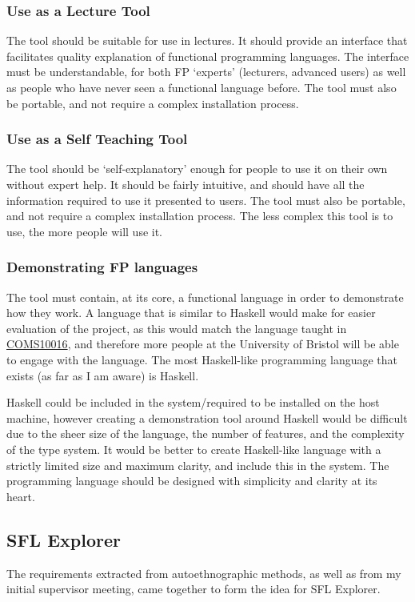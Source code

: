 \subsubsection{Use as a Lecture Tool} The tool should be suitable for use in lectures. It should provide an interface that facilitates quality explanation of functional programming languages. The interface must be understandable, for both \ac{FP} `experts' (lecturers, advanced users) as well as people who have never seen a functional language before. The tool must also be portable, and not require a complex installation process. 

\subsubsection{Use as a Self Teaching Tool} The tool should be `self-explanatory' enough for people to use it on their own without expert help. It should be fairly intuitive, and should have all the information required to use it presented to users. The tool must also be portable, and not require a complex installation process. The less complex this tool is to use, the more people will use it. 

\subsubsection{Demonstrating \ac{FP} languages} The tool must contain, at its core, a functional language in order to demonstrate how they work. A language that is similar to Haskell would make for easier evaluation of the project, as this would match the language taught in \hyperref[COMS10016]{COMS10016}, and therefore more people at the University of Bristol will be able to engage with the language. The most Haskell-like programming language that exists (as far as I am aware) is Haskell. 

Haskell could be included in the system/required to be installed on the host machine, however creating a demonstration tool around Haskell would be difficult due to the sheer size of the language, the number of features, and the complexity of the type system. It would be better to create Haskell-like language with a strictly limited size and maximum clarity, and include this in the system. The programming language should be designed with simplicity and clarity at its heart.

\subsection{SFL Explorer}
The requirements extracted from autoethnographic methods, as well as from my initial supervisor meeting, came together to form the idea for SFL Explorer. 

